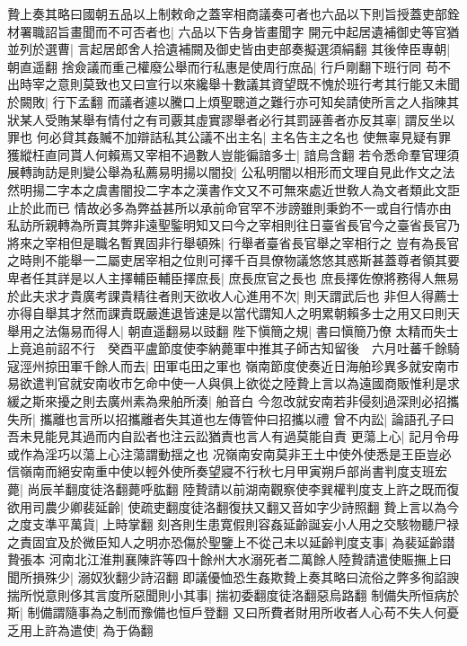 贄上奏其略曰國朝五品以上制敕命之蓋宰相商議奏可者也六品以下則旨授蓋吏部銓材署職詔旨畫聞而不可否者也|{
	六品以下告身皆畫聞字}
開元中起居遺補御史等官猶並列於選曹|{
	言起居郎舍人拾遺補闕及御史皆由吏部奏擬選須絹翻}
其後倖臣專朝|{
	朝直遥翻}
捨僉議而重己權廢公舉而行私惠是使周行庶品|{
	行戶剛翻下班行同}
苟不出時宰之意則莫致也又曰宣行以來纔舉十數議其資望既不愧於班行考其行能又未聞於闕敗|{
	行下孟翻}
而議者遽以騰口上煩聖聰道之難行亦可知矣請使所言之人指陳其狀某人受賄某舉有情付之有司覈其虛實謬舉者必行其罰誣善者亦反其辜|{
	謂反坐以罪也}
何必貸其姦贓不加辯詰私其公議不出主名|{
	主名告主之名也}
使無辜見疑有罪獲縱枉直同貰人何賴焉又宰相不過數人豈能徧諳多士|{
	諳烏含翻}
若令悉命羣官理須展轉詢訪是則變公舉為私薦易明揚以闇投|{
	公私明闇以相形而文理自見此作文之法然明揚二字本之虞書闇投二字本之漢書作文又不可無來處近世敎人為文者類此文詎止於此而已}
情故必多為弊益甚所以承前命官罕不涉謗雖則秉鈞不一或自行情亦由私訪所親轉為所賣其弊非遠聖鍳明知又曰今之宰相則往日臺省長官今之臺省長官乃將來之宰相但是職名暫異固非行舉頓殊|{
	行舉者臺省長官舉之宰相行之}
豈有為長官之時則不能舉一二屬吏居宰相之位則可擇千百具僚物議悠悠其惑斯甚蓋尊者領其要卑者任其詳是以人主擇輔臣輔臣擇庶長|{
	庶長庶官之長也}
庶長擇佐僚將務得人無易於此夫求才貴廣考課貴精往者則天欲收人心進用不次|{
	則天謂武后也}
非但人得薦士亦得自舉其才然而課責既嚴進退皆速是以當代謂知人之明累朝賴多士之用又曰則天舉用之法傷易而得人|{
	朝直遥翻易以豉翻}
陛下愼簡之規|{
	書曰愼簡乃僚}
太精而失士上竟追前詔不行　癸酉平盧節度使李納薨軍中推其子師古知留後　六月吐蕃千餘騎寇涇州掠田軍千餘人而去|{
	田軍屯田之軍也}
嶺南節度使奏近日海舶珍異多就安南市易欲遣判官就安南收市乞命中使一人與俱上欲從之陸贄上言以為遠國商販惟利是求緩之斯來擾之則去廣州素為衆舶所湊|{
	舶音白}
今忽改就安南若非侵刻過深則必招攜失所|{
	攜離也言所以招攜離者失其道也左傳管仲曰招攜以禮}
曾不内訟|{
	論語孔子曰吾未見能見其過而内自訟者也注云訟猶責也言人有過莫能自責}
更蕩上心|{
	記月令毋或作為淫巧以蕩上心注蕩謂動揺之也}
况嶺南安南莫非王土中使外使悉是王臣豈必信嶺南而絕安南重中使以輕外使所奏望寢不行秋七月甲寅朔戶部尚書判度支班宏薨|{
	尚辰羊翻度徒洛翻薨呼肱翻}
陸贄請以前湖南觀察使李巽權判度支上許之既而復欲用司農少卿裴延齡|{
	使疏吏翻度徒洛翻復扶又翻又音如字少詩照翻}
贄上言以為今之度支準平萬貨|{
	上時掌翻}
刻吝則生患寛假則容姦延齡誕妄小人用之交駭物聽尸禄之責固宜及於微臣知人之明亦恐傷於聖鑒上不從己未以延齡判度支事|{
	為裴延齡譛贄張本}
河南北江淮荆襄陳許等四十餘州大水溺死者二萬餘人陸贄請遣使賑撫上曰聞所損殊少|{
	溺奴狄翻少詩沼翻}
即議優恤恐生姦欺贄上奏其略曰流俗之弊多徇諂諛揣所悦意則侈其言度所惡聞則小其事|{
	揣初委翻度徒洛翻惡烏路翻}
制備失所恒病於斯|{
	制備謂隨事為之制而豫備也恒戶登翻}
又曰所費者財用所收者人心苟不失人何憂乏用上許為遣使|{
	為于偽翻}
